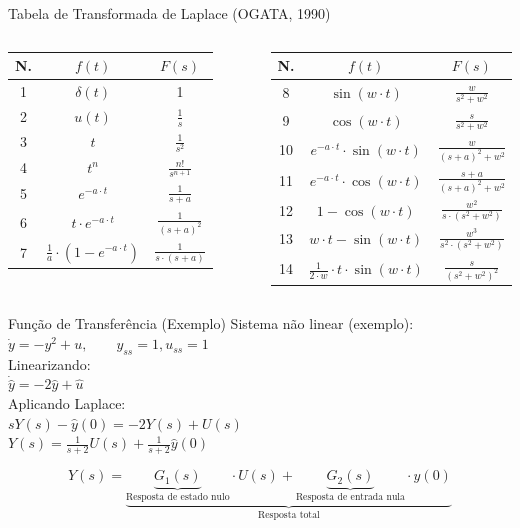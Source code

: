 \begin{frame}{Tabela de Transformada de Laplace (OGATA, 1990)}
  \centering
  \begin{columns}
    \begin{tabular}{c|c|c}
      N. & $f(t)$      & $F(s)$ \\\hline
      1  & $\delta(t)$ & 1 \\[2ex]
      2  & $u(t)$ & $\frac{1}{s}$ \\[2ex]
      3  & $t$    & $\frac{1}{s^2}$ \\[2ex]
      4  & $t^n$  & $\frac{n!}{s^{n+1}}$ \\[2ex]
      5  & $e^{-a\cdot t}$  & $\frac{1}{s+a}$
      \\[2ex]
      6  & $t\cdot e^{-a\cdot t}$  & $\frac{1}{(s+a)^2}$ \\[2ex]
      7 & $\frac{1}{a}\cdot \left(1-e^{-a\cdot t}\right)$ & $\frac{1}{s\cdot (s+a)}$\\\hline
    \end{tabular}
    \begin{tabular}{c|c|c}
      N. & $f(t)$      & $F(s)$ \\\hline
      8  & $\sin(w\cdot t)$ & $\frac{w}{s^2+w^2}$ \\[2ex]
      9  & $\cos(w\cdot t)$ & $\frac{s}{s^2+w^2}$ \\[2ex]
      10  & $e^{-a\cdot t}\cdot \sin(w\cdot t)$ & $\frac{w}{(s+a)^2+w^2}$\\[2ex]
      11  & $e^{-a\cdot t}\cdot \cos(w\cdot t)$ & $\frac{s+a}{(s+a)^2+w^2}$\\[2ex]
      12 & $1-\cos(w\cdot t)$ & $\frac{w^2}{s\cdot (s^2+w^2)}$\\[2ex]
      13 & $w\cdot t - \sin(w\cdot t)$ & $\frac{w^3}{s^2\cdot (s^2+w^2)}$ \\[2ex]
      14 & $\frac{1}{2\cdot w}\cdot t \cdot \sin(w\cdot t)$ & $\frac{s}{\left(s^2 + w^2\right)^2}$ \\\hline
    \end{tabular}
  \end{columns}
\end{frame}

\begin{frame}{Função de Transferência (Exemplo)}
  Sistema não linear (exemplo): \\
  $\dot{y}=-y^2+u, \qquad y_{ss}=1, u_{ss}=1$
  \vspace{0.2cm} \\
  Linearizando: \\
  $\dot{\hat{y}} = -2\hat{y} + \hat{u}$
  \vspace{0.2cm} \\
  Aplicando Laplace: \\
  $sY(s)-\hat{y}(0) = -2Y(s)+U(s)$ \\
  $Y(s) = \frac{1}{s+2}U(s) + \frac{1}{s+2}\hat{y}(0)$
  \begin{block}{}
    $$Y(s)=
    \underbrace{
      \underbrace{G_1(s)}_{\text{Resposta de estado nulo}} \cdot U(s) +
      \underbrace{G_2(s)}_{\text{Resposta de entrada nula}} \cdot \hat{y}(0)
    }_{\text{Resposta total}}$$
  \end{block}
\end{frame}
